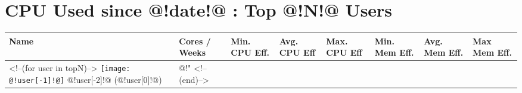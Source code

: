 \documentclass{article}[10pt]
\begin{document}
\section*{CPU Used since @!date!@ : Top @!N!@ Users}
\begin{longtable}{|l|p{10mm}|p{10mm}|p{10mm}|p{10mm}|p{10mm}|p{15mm}|p{20mm}|}
\hline
Name & Cores / Weeks & Min. CPU Eff. & Avg. CPU Eff & Max. CPU Eff & Min. Mem Eff. & Avg. Mem Eff. & Max Mem Eff. \\
\hline
\hline
<!--(for user in topN)-->
\texttt{[image: @!user[-1]!@]} @!user[-2]!@ (@!user[0]!@) & @!"%
\hline
<!--(end)-->
\end{longtable}
\end{document}

